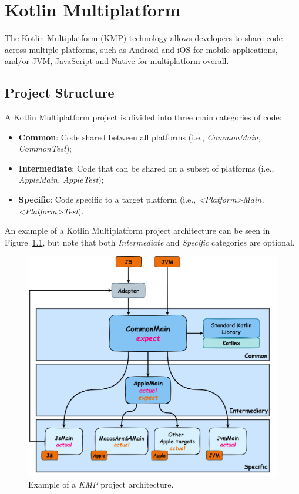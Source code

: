 \chapter{Kotlin Multiplatform}\label{ch:kotlin-multiplatform}

The Kotlin Multiplatform (KMP) technology allows developers to share code across multiple platforms, such as Android and iOS for mobile applications, and/or JVM, JavaScript and Native for multiplatform overall.


\section{Project Structure}\label{sec:project-structure}

A Kotlin Multiplatform project is divided into three main categories of code:

\begin{itemize}
    \item \textbf{Common}: Code shared between all platforms (i.e., \textit{CommonMain, CommonTest});
    \item \textbf{Intermediate}: Code that can be shared on a subset of platforms (i.e., \textit{AppleMain, AppleTest});
    \item \textbf{Specific}: Code specific to a target platform (i.e., \textit{\textless Platform\textgreater Main, \textless Platform\textgreater Test}).
\end{itemize}


An example of a Kotlin Multiplatform project architecture can be seen in Figure~\ref{fig:kmp-architecture}, but note that both \textit{Intermediate} and \textit{Specific} categories are optional.

\begin{figure}[H]
    \centering
    \caption{Example of a \textit{KMP} project architecture.}
    \label{fig:kmp-architecture}
    \vspace{0.3cm}
    \includegraphics[width=1\textwidth]{../figures/02_kmp-architecture}
\end{figure}


